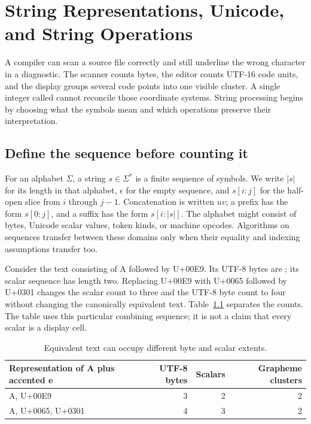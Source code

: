 \chapter{String Representations, Unicode, and String Operations}
\label{ch:strings-representation}

A compiler can scan a source file correctly and still underline the wrong character in a diagnostic.
The scanner counts bytes, the editor counts UTF-16 code units, and the display groups several code points into one visible cluster.
A single integer called  cannot reconcile those coordinate systems.
String processing begins by choosing what the symbols mean and which operations preserve their interpretation.

\section{Define the sequence before counting it}
\label{sec:ch77-sequences}
For an alphabet $\Sigma$, a string $s\in\Sigma^*$ is a finite sequence of symbols.
We write $|s|$ for its length in that alphabet, $\epsilon$ for the empty sequence, and $s[i:j]$ for the half-open slice from $i$ through $j-1$.
Concatenation is written $uv$; a prefix has the form $s[0:j]$, and a suffix has the form $s[i:|s|]$.
The alphabet might consist of bytes, Unicode scalar values, token kinds, or machine opcodes.
Algorithms on sequences transfer between these domains only when their equality and indexing assumptions transfer too.

Consider the text consisting of A followed by U+00E9.
Its UTF-8 bytes are ; its scalar sequence has length two.
Replacing U+00E9 with U+0065 followed by U+0301 changes the scalar count to three and the UTF-8 byte count to four without changing the canonically equivalent text.
Table~\ref{tab:ch77-units} separates the counts.
The table uses this particular combining sequence; it is not a claim that every scalar is a display cell.

\begin{table}[htbp]
\caption{Equivalent text can occupy different byte and scalar extents.}
\label{tab:ch77-units}
\centering
\begin{tabular}{lrrr}
\toprule
Representation of A plus accented e & UTF-8 bytes & Scalars & Grapheme clusters \\
\midrule
A, U+00E9 & 3 & 2 & 2 \\
A, U+0065, U+0301 & 4 & 3 & 2 \\
\bottomrule
\end{tabular}
\end{table}

